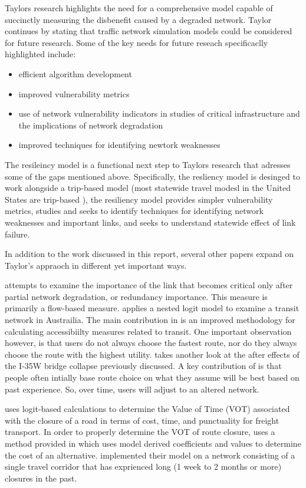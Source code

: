 Taylors research highlights the need for a comprehensive model capable
of succinctly measuring the disbenefit caused by a degraded network.
Taylor continues by stating that traffic network simulation models
could be considered for future research. Some of the key needs for
future reseach specificaclly highlighted include:

	\begin{itemize}
		\item efficient algorithm development
		\item improved vulnerability metrics
		\item use of network vulnerability indicators in studies of critical
		infrastructure and the implications of network degradation
		\item improved techniques for identifying newtork weaknesses
	\end{itemize}

The resileincy model is a functional next step to Taylors research that
adresses some of the gaps mentioned above. Specifically, the resliency
model is desinged to work alongside a trip-based model (most statewide
travel modesl in the United States are trip-based \cite{tfr2021}), the
resiliency model provides simpler vulnerability metrics, studies and seeks
to identify techniques for identifying network weaknesses and important
links, and seeks to understand statewide effect of link failure.

In addition to the work discussed in this report, several other papers
expand on Taylor's appraoch in different yet important ways.

\cite{Jenelius2010} attempts to examine the importance of the link that
becomes critical only after partial network degradation, or redundancy
importance. This measure is primarily a flow-based measure.
\cite{Nassir2016} applies a nested logit model to examine a transit
network in Austrailia. The main contribution in \cite{Nassir2016} is an
improved methodology for calculating accessibiilty  measures related to
transit. One important observation however, is that users do not always
choose the fastest route, nor do they always choose the route with the
highest utility. \cite{He2012} takes another look at the after effects of
the I-35W bridge collapse previously discussed. A key contribution of
\cite{He2012} is that people often intially base route choice on what they
assume will be best based on past experience. So, over time, users will
adjust to an altered network.

\cite{Masiero2012} uses logit-based calculations to determine the Value of
Time (VOT) associated with the closure of a road in terms of cost, time,
and punctuality for freight transport. In order to properly determine the
VOT of route closure, \cite{Masiero2012} uses a method provided in
\cite{koppelman2006} which uses model derived coefficients and values to
determine the cost of an alternative. \cite{Masiero2012} implemented their
model on a network consisting of a single travel corridor that has
exprienced long (1 week to 2 months or more) closures in the past.

